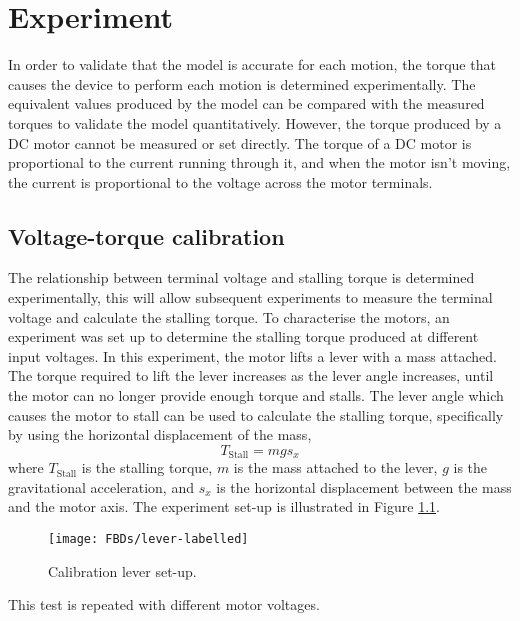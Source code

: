 \chapter{Experiment}

In order to validate that the model is accurate for each motion, the torque that causes the device to perform each motion is determined experimentally. The equivalent values produced by the model can be compared with the measured torques to validate the model quantitatively. However, the torque produced by a DC motor cannot be measured or set directly. The torque of a DC motor is proportional to the current running through it, and when the motor isn't moving, the current is proportional to the voltage across the motor terminals.

\section{Voltage-torque calibration} \label{sec:Voltage-torque calibration}
The relationship between terminal voltage and stalling torque is determined experimentally, this will allow subsequent experiments to measure the terminal voltage and calculate the stalling torque.
To characterise the motors, an experiment was set up to determine the stalling torque produced at different input voltages. In this experiment, the motor lifts a lever with a mass attached. The torque required to lift the lever increases as the lever angle increases, until the motor can no longer provide enough torque and stalls. The lever angle which causes the motor to stall can be used to calculate the stalling torque, specifically by using the horizontal displacement of the mass,
\begin{equation}
	T_\mathrm{Stall} = m g s_x
\end{equation}
where $T_\mathrm{Stall}$ is the stalling torque, $m$ is the mass attached to the lever, $g$ is the gravitational acceleration, and $s_x$ is the horizontal displacement between the mass and the motor axis. The experiment set-up is illustrated in Figure \ref{fig:lever-labelled}.
\begin{figure}[!h]
	\centering
	\texttt{[image: FBDs/lever-labelled]}
	\caption{Calibration lever set-up.}
	\label{fig:lever-labelled}
\end{figure}
This test is repeated with different motor voltages.\\

